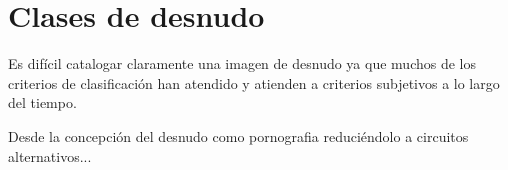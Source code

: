 \chapter{Clases de desnudo}

Es dif\'icil catalogar claramente una imagen de desnudo ya que muchos de los criterios de clasificaci\'on han atendido y atienden a criterios subjetivos a lo largo del tiempo.

Desde la concepci\'on del desnudo como \gls{pornografia} reduci\'endolo a circuitos alternativos...